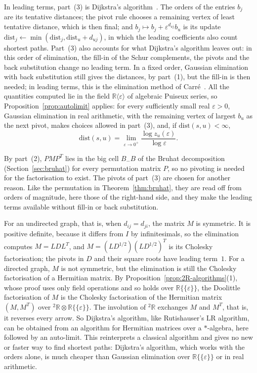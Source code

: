 \documentclass[12pt, a4paper]{report}
\theoremstyle{plain}
\theoremstyle{definition}
\theoremstyle{remark}
\theoremstyle{plain}
\newcommand{\RR}{\mathbb{R}}
\newcommand{\twoR}{{}^{2}\mathbb{R}}
\begin{document}
In leading terms, part~(3) is Dijkstra's algorithm~\cite{Dijkstra1959}. The orders of the entries $b_j$ are its tentative distances; the pivot rule chooses a remaining vertex of least tentative distance, which is then final; and $b_j\mapsto b_j+\varepsilon^{d_{uj}}b_u$ is its update $\mathrm{dist}_j\leftarrow\min(\mathrm{dist}_j,\mathrm{dist}_u+d_{uj})$, in which the leading coefficients also count shortest paths. Part~(3) also accounts for what Dijkstra's algorithm leaves out: in this order of elimination, the fill-in of the Schur complements, the pivots and the back substitution change no leading term. In a fixed order, Gaussian elimination with back substitution still gives the distances, by part~(1), but the fill-in is then needed; in leading terms, this is the elimination method of Carr\'e~\cite{Carre1971}. All the quantities computed lie in the field $\RR\langle\varepsilon\rangle$ of algebraic Puiseux series, so Proposition~\ref{prop:autolimit} applies: for every sufficiently small real $\varepsilon>0$, Gaussian elimination in real arithmetic, with the remaining vertex of largest $b_u$ as the next pivot, makes choices allowed in part~(3), and, if $\mathrm{dist}(s,u)<\infty$,
\[ \mathrm{dist}(s,u)=\lim_{\varepsilon\to0^+}\frac{\log z_u(\varepsilon)}{\log\varepsilon}. \]

By part~(2), $PMP^T$ lies in the big cell $B_-B$ of the Bruhat decomposition (Section~\ref{sec:bruhat}) for every permutation matrix $P$, so no pivoting is needed for the factorisation to exist. The pivots of part~(3) are chosen for another reason. Like the permutation in Theorem~\ref{thm:bruhat}, they are read off from orders of magnitude, here those of the right-hand side, and they make the leading terms available without fill-in or back substitution.

For an undirected graph, that is, when $d_{ij}=d_{ji}$, the matrix $M$ is symmetric. It is positive definite, because it differs from $I$ by infinitesimals, so the elimination computes $M=LDL^T$, and $M=(LD^{1/2})(LD^{1/2})^T$ is its Cholesky factorisation; the pivots in $D$ and their square roots have leading term~$1$. For a directed graph, $M$ is not symmetric, but the elimination is still the Cholesky factorisation of a Hermitian matrix. By Proposition~\ref{prop:2R-algorithms}(1), whose proof uses only field operations and so holds over $\RR\{\{\varepsilon\}\}$, the Doolittle factorisation of $M$ is the Cholesky factorisation of the Hermitian matrix $(M,M^T)$ over $\twoR\otimes\RR\{\{\varepsilon\}\}$. The involution of $\twoR$ exchanges $M$ and $M^T$, that is, it reverses every arrow. So Dijkstra's algorithm, like Rutishauser's LR algorithm, can be obtained from an algorithm for Hermitian matrices over a $*$-algebra, here followed by an auto-limit. This reinterprets a classical algorithm and gives no new or faster way to find shortest paths: Dijkstra's algorithm, which works with the orders alone, is much cheaper than Gaussian elimination over $\RR\{\{\varepsilon\}\}$ or in real arithmetic.
\end{document}
